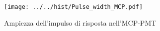 \begin{figure}[h] \centering \texttt{[image: ../../hist/Pulse\_width\_MCP.pdf]}\caption{Ampiezza dell'impulso di risposta nell'MCP-PMT}\label{hist:Pulse_width_MCP} \end{figure}
